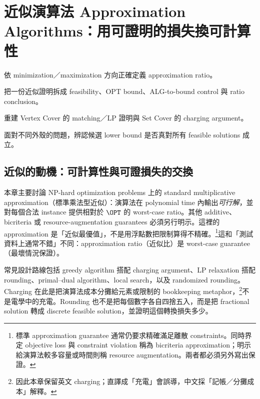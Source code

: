 \documentclass[11pt,a4paper,oneside,openany]{book}
\begin{document}
\chapter{近似演算法 Approximation Algorithms：用可證明的損失換可計算性}
\label{ch:approx}
\begin{chaptermastery}
\item 依 minimization／maximization 方向正確定義 approximation ratio。
\item 把一份近似證明拆成 feasibility、OPT bound、ALG-to-bound control 與 ratio conclusion。
\item 重建 Vertex Cover 的 matching／LP 證明與 Set Cover 的 charging argument。
\item 面對不同外殼的問題，辨認候選 lower bound 是否真對所有 feasible solutions 成立。
\end{chaptermastery}

\section{近似的動機：可計算性與可證損失的交換}
本章主要討論 NP-hard optimization problems 上的 standard multiplicative approximation（標準乘法型近似）：演算法在 polynomial time 內輸出\emph{可行解}，並對每個合法 instance 提供相對於 $\OPT$ 的 worst-case ratio。其他 additive、bicriteria 或 resource-augmentation guarantees 必須另行明示。這裡的 approximation 是「近似最優值」，不是用浮點數把限制算得不精確。\footnote{標準 approximation guarantee 通常仍要求精確滿足離散 constraints。同時界定 objective loss 與 constraint violation 稱為 bicriteria approximation；明示給演算法較多容量或時間則稱 resource augmentation。兩者都必須另外寫出保證。}這和「測試資料上通常不錯」不同：approximation ratio（近似比）是 worst-case guarantee（最壞情況保證）。

常見設計路線包括 greedy algorithm 搭配 charging argument、LP relaxation 搭配 rounding、primal--dual algorithm、local search，以及 randomized rounding。Charging 在此是把演算法成本分攤給元素或限制的 bookkeeping metaphor，\footnote{因此本章保留英文 charging；直譯成「充電」會誤導，中文採「記帳／分攤成本」解釋。}不是電學中的充電。Rounding 也不是把每個數字各自四捨五入，而是把 fractional solution 轉成 discrete feasible solution，並證明這個轉換損失多少。
\end{document}
